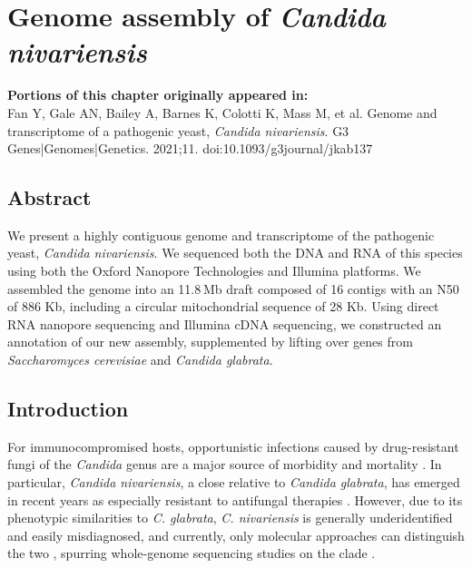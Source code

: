 \chapter{Genome assembly of \textit{Candida nivariensis}}
\label{chap:nivar}

\textbf{Portions of this chapter originally appeared in:} \\
Fan Y, Gale AN, Bailey A, Barnes K, Colotti K, Mass M, et al. Genome and transcriptome of a pathogenic yeast, \textit{Candida nivariensis}. G3 Genes|Genomes|Genetics. 2021;11. doi:10.1093/g3journal/jkab137

\section{Abstract}
\label{sec:abstract}

We present a highly contiguous genome and transcriptome of the pathogenic yeast, \textit{Candida nivariensis}. We sequenced both the DNA and RNA of this species using both the Oxford Nanopore Technologies and Illumina platforms. We assembled the genome into an 11.8 Mb draft composed of 16 contigs with an N50 of 886 Kb, including a circular mitochondrial sequence of 28 Kb. Using direct RNA nanopore sequencing and Illumina cDNA sequencing, we constructed an annotation of our new assembly, supplemented by lifting over genes from \textit{Saccharomyces cerevisiae} and \textit{Candida glabrata}.

\section{Introduction}
\label{sec:intro}

For immunocompromised hosts, opportunistic infections caused by drug-resistant fungi of the \textit{Candida} genus are a major source of morbidity and mortality \citep{Borman2008-cr}. In particular, \textit{Candida nivariensis}, a close relative to \textit{Candida glabrata}, has emerged in recent years as especially resistant to antifungal therapies \citep{Borman2008-cr}. However, due to its phenotypic similarities to \textit{C. glabrata}, \textit{C. nivariensis} is generally underidentified and easily misdiagnosed, and currently, only molecular approaches can distinguish the two \citep{Aznar-Marin2016-yp}, spurring whole-genome sequencing studies on the clade \citep{Gabaldon2013-bk}.

